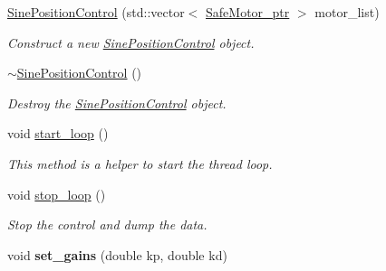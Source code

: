 \begin{DoxyCompactItemize}
\item 
\hyperlink{classblmc__drivers_1_1SinePositionControl_a6f5a006338c7975f9aeef5987384c661}{Sine\+Position\+Control} (std\+::vector$<$ \hyperlink{namespaceblmc__drivers_ab975c3be3c53a93a10c491f07a132e2b}{Safe\+Motor\+\_\+ptr} $>$ motor\+\_\+list)
\begin{DoxyCompactList}\small\item\em Construct a new \hyperlink{classblmc__drivers_1_1SinePositionControl}{Sine\+Position\+Control} object. \end{DoxyCompactList}\item 
\hyperlink{classblmc__drivers_1_1SinePositionControl_a35004249215059c73863e71680b977a8}{$\sim$\+Sine\+Position\+Control} ()\hypertarget{classblmc__drivers_1_1SinePositionControl_a35004249215059c73863e71680b977a8}{}\label{classblmc__drivers_1_1SinePositionControl_a35004249215059c73863e71680b977a8}

\begin{DoxyCompactList}\small\item\em Destroy the \hyperlink{classblmc__drivers_1_1SinePositionControl}{Sine\+Position\+Control} object. \end{DoxyCompactList}\item 
void \hyperlink{classblmc__drivers_1_1SinePositionControl_a0766604ca7e58200e97547e61e0f4cc8}{start\+\_\+loop} ()\hypertarget{classblmc__drivers_1_1SinePositionControl_a0766604ca7e58200e97547e61e0f4cc8}{}\label{classblmc__drivers_1_1SinePositionControl_a0766604ca7e58200e97547e61e0f4cc8}

\begin{DoxyCompactList}\small\item\em This method is a helper to start the thread loop. \end{DoxyCompactList}\item 
void \hyperlink{classblmc__drivers_1_1SinePositionControl_a61875cedee870d5cc0cb5e10799b1c24}{stop\+\_\+loop} ()\hypertarget{classblmc__drivers_1_1SinePositionControl_a61875cedee870d5cc0cb5e10799b1c24}{}\label{classblmc__drivers_1_1SinePositionControl_a61875cedee870d5cc0cb5e10799b1c24}

\begin{DoxyCompactList}\small\item\em Stop the control and dump the data. \end{DoxyCompactList}\item 
void {\bfseries set\+\_\+gains} (double kp, double kd)\hypertarget{classblmc__drivers_1_1SinePositionControl_a0a86810773b5a172cbc5f407fa59df4d}{}\label{classblmc__drivers_1_1SinePositionControl_a0a86810773b5a172cbc5f407fa59df4d}

\end{DoxyCompactItemize}
